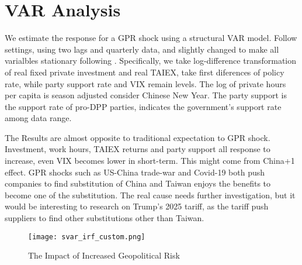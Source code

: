 
\chapter{VAR Analysis}

We estimate the response for a GPR shock using a structural VAR model. Follow \citet{caldara} settings, using two lags and quarterly data, and slightly changed to make all varialbles stationary following \citet{brignone}. Specifically, we take log-difference transformation of real fixed private investment and real TAIEX, take first diferences of policy rate, while party support rate and VIX remain levels. The log of private hours per capita is season adjusted consider Chinese New Year. The party support is the support rate of pro-DPP parties, indicates the government's support rate among data range. 

The Results are almost opposite to traditional expectation to GPR shock. Investment, work hours, TAIEX returns and party support all response to increase, even VIX becomes lower in short-term. This might come from China+1 effect. GPR shocks such as US-China trade-war and Covid-19 both push companies to find substitution of China and Taiwan enjoys the benefits to become one of the substitution. The real cause needs further investigation, but it would be interesting to research on Trump's 2025 tariff, as the tariff push suppliers to find other substitutions other than Taiwan.

\begin{figure}[htbp]
  \centering
  \texttt{[image: svar\_irf\_custom.png]}
  \caption{The Impact of Increased Geopolitical Risk}
  \label{fig:my_example}
\end{figure}